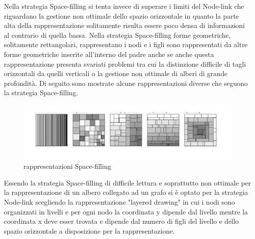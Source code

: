 {Nella strategia Space-filling si tenta invece di superare i limiti del Node-link che riguardano la gestione non ottimale dello spazio orizzontale in quanto la parte alta della rappresentazione solitamente risulta essere poco densa di informazioni al contrario di quella bassa. Nella strategia Space-filling forme geometriche, solitamente rettangolari, rappresentano i nodi e i figli sono rappresentati da altre forme geometriche inserite all'interno del padre anche se anche questa rappresentazione presenta svariati problemi tra cui la distinzione difficile di tagli orizzontali da quelli verticali o la gestione non ottimale di alberi di grande profondità. Di seguito sono mostrate alcune rappresentazioni diverse che seguono la strategia Space-filling.
\begin{figure}[!htb]
	\begin{center}
		\includegraphics[width=0.9 \linewidth]{figure/spaceFilling}
	\end{center}
	\caption{rappresentazioni Space-filling\label{fig:spaceFilling}}
\end{figure}
\newline
Essendo la strategia Space-filling di difficile lettura e soprattutto non ottimale per la rappresentazione di un albero collegato ad un grafo si è optato per la strategia Node-link scegliendo la rappresentazione "layered drawing" in cui i nodi sono organizzati in livelli e per ogni nodo la coordinata y dipende dal livello mentre la coordinata x deve esser trovata e dipende dal numero di figli del livello e dello spazio orizzontale a disposizione per la rappresentazione.

}

